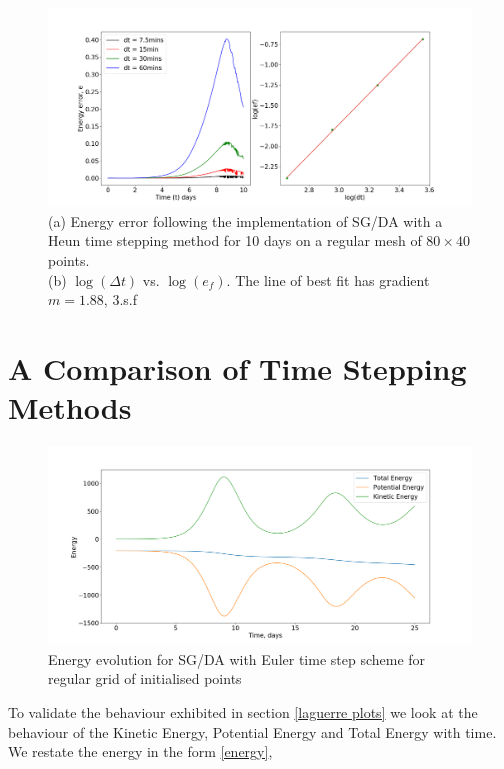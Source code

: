 \begin{figure}[h]
	\includegraphics[width=1.1\linewidth]{evaluation/energy_10D_heun}
	\caption[Energy Error from implementation of SG/DA via Heun timestepping method for 10 days]{(a) Energy error following the implementation of SG/DA with a Heun time stepping method for 10 days on a regular mesh of $80 \times 40$ points.\\ 
		(b) $\log(\Delta t)$ vs. $\log(e_f)$. The line of best fit has gradient $m = 1.88$, 3.s.f}
	\label{fig:energy10dheun}
\end{figure}  
\pagebreak
\section{A Comparison of Time Stepping Methods \label{comparison}}

\begin{figure}[h]
	\centering
	\includegraphics[width=0.8\linewidth]{evaluation/Energy_evolution_euler}
	\caption[Energy evolution for SG/DA with Euler time step scheme]{Energy evolution for SG/DA with Euler time step scheme for regular grid of initialised points}
	\label{fig:energyevolutioneuler}
\end{figure}

To validate the behaviour exhibited in section \ref{laguerre plots} we look at the behaviour of the Kinetic Energy, Potential Energy and Total Energy with time. We restate the energy in the form \ref{energy},

